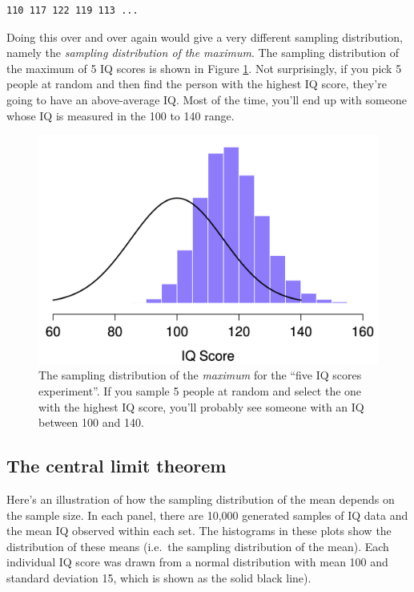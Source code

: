 \documentclass[
]{book}
\theoremstyle{definition}
\theoremstyle{definition}
\theoremstyle{definition}
\theoremstyle{definition}
\theoremstyle{remark}
\begin{document}
\begin{verbatim}
110 117 122 119 113 ... 
\end{verbatim}

Doing this over and over again would give a very different sampling distribution, namely the \emph{sampling distribution of the maximum}. The sampling distribution of the maximum of 5 IQ scores is shown in Figure \ref{fig:sampdistmax}. Not surprisingly, if you pick 5 people at random and then find the person with the highest IQ score, they're going to have an above-average IQ. Most of the time, you'll end up with someone whose IQ is measured in the 100 to 140 range.



\begin{figure}

{\centering \includegraphics[width=0.66\linewidth]{resources/image/sampleDistMax} 

}

\caption{The sampling distribution of the \emph{maximum} for the ``five IQ scores experiment''. If you sample 5 people at random and select the one with the highest IQ score, you'll probably see someone with an IQ between 100 and 140.}\label{fig:sampdistmax}
\end{figure}

\hypertarget{clt}{%
\subsection{The central limit theorem}\label{clt}}

Here's an illustration of how the sampling distribution of the mean depends on the sample size. In each panel, there are 10,000 generated samples of IQ data and the mean IQ observed within each set. The histograms in these plots show the distribution of these means (i.e.~the sampling distribution of the mean). Each individual IQ score was drawn from a normal distribution with mean 100 and standard deviation 15, which is shown as the solid black line).
\end{document}
